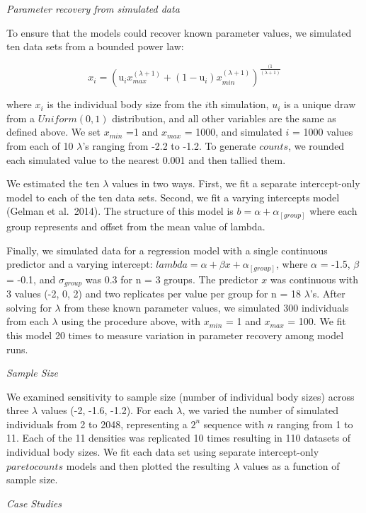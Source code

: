 \documentclass[
  12pt,
]{article}
\begin{document}
\emph{Parameter recovery from simulated data}

To ensure that the models could recover known parameter values, we
simulated ten data sets from a bounded power law:

\[
x_i = (\text{u}_ix_{max}^{(\lambda+1)} +  (1-\text{u}_i)  x_{min}^{(\lambda+1)} ) ^ {\frac{(1}{(\lambda+1)}}
\]

where \(x_i\) is the individual body size from the \(i\)th simulation,
\(u_i\) is a unique draw from a \(Uniform(0,1)\) distribution, and all
other variables are the same as defined above. We set \(x_{min}\) =1 and
\(x_{max}\) = 1000, and simulated \(i\) = 1000 values from each of 10
\(\lambda\)'s ranging from -2.2 to -1.2. To generate \(counts\), we
rounded each simulated value to the nearest 0.001 and then tallied them.

We estimated the ten \(\lambda\) values in two ways. First, we fit a
separate intercept-only model to each of the ten data sets. Second, we
fit a varying intercepts model (Gelman et al.~2014). The structure of
this model is \(b = \alpha + \alpha_{[group]}\) where each group
represents and offset from the mean value of lambda.

Finally, we simulated data for a regression model with a single
continuous predictor and a varying intercept:
\(lambda = \alpha + \beta x + \alpha_{[group]}\), where \(\alpha\) =
-1.5, \(\beta\) = -0.1, and \(\sigma_{group}\) was 0.3 for n = 3 groups.
The predictor \(x\) was continuous with 3 values (-2, 0, 2) and two
replicates per value per group for n = 18 \(\lambda\)'s. After solving
for \(\lambda\) from these known parameter values, we simulated 300
individuals from each \(\lambda\) using the procedure above, with
\(x_{min}\) = 1 and \(x_{max}\) = 100. We fit this model 20 times to
measure variation in parameter recovery among model runs.

\emph{Sample Size}

We examined sensitivity to sample size (number of individual body sizes)
across three \(\lambda\) values (-2, -1.6, -1.2). For each \(\lambda\),
we varied the number of simulated individuals from 2 to 2048,
representing a \(2^n\) sequence with \(n\) ranging from 1 to 11. Each of
the 11 densities was replicated 10 times resulting in 110 datasets of
individual body sizes. We fit each data set using separate
intercept-only \(paretocounts\) models and then plotted the resulting
\(\lambda\) values as a function of sample size.

\emph{Case Studies}
\end{document}
